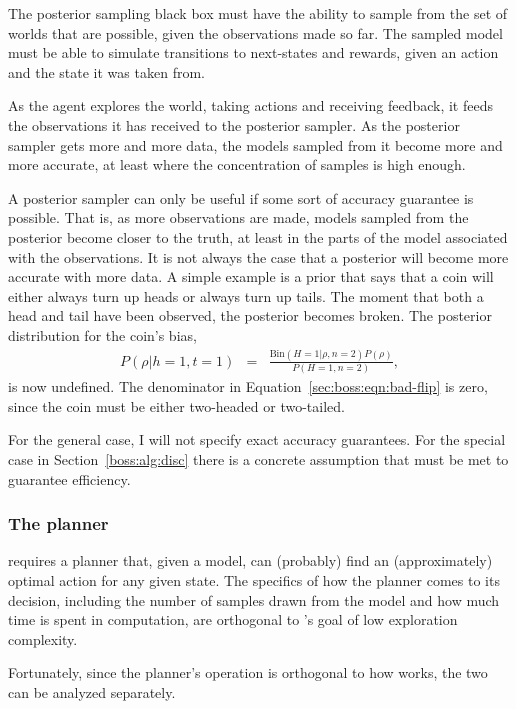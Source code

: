 The posterior sampling black box must have the ability to sample from the set of worlds that are possible, given the observations made so far. The sampled model must be able to simulate transitions to next-states and rewards, given an action and the state it was taken from.

As the agent explores the world, taking actions and receiving feedback, it feeds the observations it has received to the posterior sampler. As the posterior sampler gets more and more data, the models sampled from it become more and more accurate, at least where the concentration of samples is high enough.

A posterior sampler can only be useful if some sort of accuracy guarantee is possible. That is, as more observations are made, models sampled from the posterior become closer to the truth, at least in the parts of the model associated with the observations. It is not always the case that a posterior will become more accurate with more data. A simple example is a prior that says that a coin will either always turn up heads or always turn up tails. The moment that both a head and tail have been observed, the posterior becomes broken. The posterior distribution for the coin's bias,
\begin{eqnarray}
P(\rho|h=1,t=1) &=& \frac{\mbox{Bin}(H=1|\rho,n=2)P(\rho)}{P(H=1,n=2)}, \label{sec:boss:eqn:bad-flip}
\end{eqnarray}
is now undefined. The denominator in Equation~\ref{sec:boss:eqn:bad-flip} is zero, since the coin must be either two-headed or two-tailed.

For the general case, I will not specify exact accuracy guarantees. For the special case in Section~\ref{boss:alg:disc} there is a concrete assumption that must be met to guarantee efficiency.

\subsubsection{The planner}

 requires a planner that, given a model, can (probably) find an (approximately) optimal action for any given state. The specifics of how the planner comes to its decision, including the number of samples drawn from the model and how much time is spent in computation, are orthogonal to 's goal of low exploration complexity.

Fortunately, since the planner's operation is orthogonal to how  works, the two can be analyzed separately.

